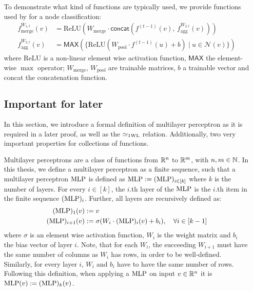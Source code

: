 To demonstrate what kind of functions are typically used, we provide functions used by \cite{Ham+2017} for a node classification:
\begin{align*}
    f^{W_{1,t}}_{\text{merge}}(v) &= \text{ReLU} (W_{\text{merge}} \cdot \textsf{concat}(f^{(t-1)}(v), \ f^{W_{2,t}}_{\text{agg}}(v)))\\
    f^{W_{2,t}}_{\text{agg}}(v) &= \textsf{MAX}(\{ \text{ReLU}(W_{\text{pool}} \cdot f^{(t-1)}(u) + b) \mid u \in \mathcal{N}(v)\})
\end{align*}
where $\text{ReLU}$ is a non-linear element wise activation function, $\textsf{MAX}$ the element-wise $\max$ operator; $W_{\text{merge}}$, $W_{\text{pool}}$ are trainable matrices, $b$ a trainable vector and \textsf{concat} the concatenation function.



\subsection{Important for later}
In this section, we introduce a formal definition of multilayer perceptron as it is required in a later proof, as well as the $\simeq_{\text{1WL}}$ relation. Additionally, two very important properties for collections of functions.

\begin{definition}\label{def:mlp}
    Multilayer perceptrons are a class of functions from $\mathbb{R}^n$ to $\mathbb{R}^m$, with $n,m \in \mathbb{N}$. In this thesis, we define a multilayer perceptron as a finite sequence, such that a multilayer perceptron $\text{MLP}$ is defined as $\text{MLP} := (\text{MLP})_{i\in[k]}$ where $k$ is the number of layers. For every $i \in [k]$, the $i$.th layer of the $\text{MLP}$ is the $i$.th item in the finite sequence $(\text{MLP})_i$. Further, all layers are recursively defined as:
    \begin{align*}
        (\text{MLP})_{1}(v) &:= v\\
        (\text{MLP})_{i+1}(v) &:= \sigma(W_i \cdot (\text{MLP})_{i} (v) + b_i), \quad \forall i \in [k-1]
    \end{align*}
    where $\sigma$ is an element wise activation function, $W_i$ is the weight matrix and $b_i$ the bias vector of layer $i$. Note, that for each $W_i$, the succeeding $W_{i+1}$ must have the same number of columns as $W_i$ has rows, in order to be well-defined. Similarly, for every layer $i$, $W_i$ and $b_i$ have to have the same number of rows.
    Following this definition, when applying a $\text{MLP}$ on input $v \in \mathbb{R}^n$ it is $\text{MLP}(v) := (\text{MLP})_k(v)$.
\end{definition}

